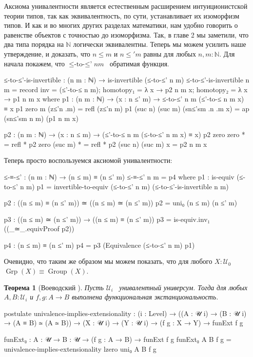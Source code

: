 \documentclass{article}[12pt]
\newtheorem{theorem}{Теорема}
\newcommand{\dash}{\textemdash\ }
\newcommand{\op}{\operatorname}
\begin{document}
Аксиома унивалентности является естественным расширением интуиционистской теории типов, так как
эквивалентность, по сути, устанавливает их изоморфизм типов. И как и во многих других
разделах математики, нам удобно говорить о равенстве объектов с точностью до изоморфизма.
Так, в главе 2 мы заметили, что два типа порядка на $\mathbb{N}$ логически эквивалентны.
Теперь мы можем усилить наше утверждение, и доказать, что $n \leq m$ и $n \leq' m$ равны
для любых $n, m : \mathbb{N}$. Для начала покажем, что $\op{≤-to-≤’} n m$ \dash обратимая
функция.
\begin{code}
≤-to-≤'-is-invertible : (n m : ℕ) → is-invertible (≤-to-≤' n m)
≤-to-≤'-is-invertible n m = 
    record {inv = (≤'-to-≤ n m);
            homotopy₁ = λ x → p2 n m x;
            homotopy₂ = λ x → p1 n m x}
    where
        p1 : (n m : ℕ) → (x : n ≤' m) → ≤-to-≤' n m (≤'-to-≤ n m x) ≡ x
        p1 zero m (z≤'n .m) = refl (z≤'n m)
        p1 (suc n) (suc m) (sn≤'sm .n .m x) = ap (sn≤'sm n m) (p1 n m x)

        p2 : (n m : ℕ) → (x : n ≤ m) → (≤'-to-≤ n m (≤-to-≤' n m x) ≡ x)
        p2 zero zero * = refl *
        p2 zero (suc m) * = refl *
        p2 (suc n) (suc m) x = p2 n m x
\end{code}
Теперь просто воспользуемся аксиомой унивалентности:
\begin{code}
≤-≡-≤' : (n m : ℕ) → (n ≤ m) ≡ (n ≤' m)
≤-≡-≤' n m = p4
    where
        p1 : is-equiv (≤-to-≤' n m)
        p1 = invertible-to-equiv (≤-to-≤' n m) (≤-to-≤'-is-invertible n m)

        p2 : ((n ≤ m) ≡ (n ≤' m)) ≃ ((n ≤ m) ≃ (n ≤' m))
        p2 = uni₀ (n ≤ m) (n ≤' m)

        p3 :  ((n ≤ m) ≃ (n ≤' m)) → ((n ≤ m) ≡ (n ≤' m))
        p3 = is-equiv.inv₁ ((_≃_.equivProof p2))

        p4 : (n ≤ m) ≡ (n ≤' m)
        p4 = p3 (Equivalence (≤-to-≤' n m) p1)
\end{code}

Очевидно, что таким же образом мы можем показать, что для любого $X : \mathcal{U}_0$ 
$\op{Grp}(X) \equiv \op{Group}(X)$.

\begin{theorem}[Воеводский \cite{Rij22}]
    Пусть $\mathcal U_i$ \dash унивалентный универсум. Тогда для любых $A, B : \mathcal U_i$ и
    $f, g : A \rightarrow B$ выполнена функциональная экстанциональность.
\end{theorem}
\begin{code}
postulate
    univalence-implies-extensionality : (i : Level) 
        → ((A : 𝒰 i) → (B : 𝒰 i) → (A ≡ B) ≃ (A ≃ B))
        → (X : 𝒰 i) → (Y : 𝒰 i)
        → (f g : X → Y)
        → funExt f g

funExt₀ : {A : 𝒰} → {B : 𝒰}
          → (f g : A → B)
          → funExt f g
funExt₀ {A} {B} f g = univalence-implies-extensionality lzero uni₀ A B f g
\end{code}
\end{document}
